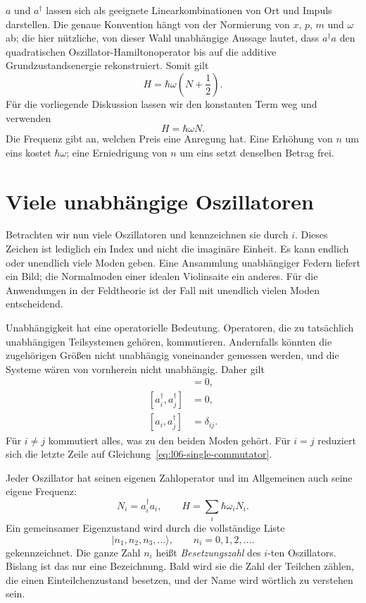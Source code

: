 \(a\) und \(a^\dagger\) lassen sich als geeignete Linearkombinationen von Ort und Impuls darstellen. Die genaue Konvention hängt von der Normierung von \(x\), \(p\), \(m\) und \(\omega\) ab; die hier nützliche, von dieser Wahl unabhängige Aussage lautet, dass \(a^\dagger a\) den quadratischen Oszillator-Hamiltonoperator bis auf die additive Grundzustandsenergie rekonstruiert. Somit gilt
\begin{equation}
H=\hbar\omega\left(N+\frac12\right).
\end{equation}
Für die vorliegende Diskussion lassen wir den konstanten Term weg und verwenden
\begin{equation}
H=\hbar\omega N.
\label{eq:l06-one-oscillator-hamiltonian}
\end{equation}
Die Frequenz gibt an, welchen Preis eine Anregung hat. Eine Erhöhung von \(n\) um eins kostet \(\hbar\omega\); eine Erniedrigung von \(n\) um eins setzt denselben Betrag frei.

\section{Viele unabhängige Oszillatoren}

Betrachten wir nun viele Oszillatoren und kennzeichnen sie durch \(i\). Dieses Zeichen ist lediglich ein Index und nicht die imaginäre Einheit. Es kann endlich oder unendlich viele Moden geben. Eine Ansammlung unabhängiger Federn liefert ein Bild; die Normalmoden einer idealen Violinsaite ein anderes. Für die Anwendungen in der Feldtheorie ist der Fall mit unendlich vielen Moden entscheidend.

Unabhängigkeit hat eine operatorielle Bedeutung. Operatoren, die zu tatsächlich unabhängigen Teilsystemen gehören, kommutieren. Andernfalls könnten die zugehörigen Größen nicht unabhängig voneinander gemessen werden, und die Systeme wären von vornherein nicht unabhängig. Daher gilt
\begin{align}
[a_i,a_j]&=0, \\
[a_i^\dagger,a_j^\dagger]&=0, \\
[a_i,a_j^\dagger]&=\delta_{ij}.
\label{eq:l06-many-commutators}
\end{align}
Für \(i\ne j\) kommutiert alles, was zu den beiden Moden gehört. Für \(i=j\) reduziert sich die letzte Zeile auf Gleichung~\eqref{eq:l06-single-commutator}.

Jeder Oszillator hat seinen eigenen Zahloperator und im Allgemeinen auch seine eigene Frequenz:
\begin{equation}
N_i=a_i^\dagger a_i,
\qquad
H=\sum_i\hbar\omega_i N_i.
\label{eq:l06-many-hamiltonian}
\end{equation}
Ein gemeinsamer Eigenzustand wird durch die vollständige Liste
\begin{equation}
|n_1,n_2,n_3,\ldots\rangle,
\qquad n_i=0,1,2,\ldots.
\label{eq:l06-occupation-ket}
\end{equation}
gekennzeichnet. Die ganze Zahl \(n_i\) heißt \emph{Besetzungszahl} des \(i\)-ten Oszillators. Bislang ist das nur eine Bezeichnung. Bald wird sie die Zahl der Teilchen zählen, die einen Einteilchenzustand besetzen, und der Name wird wörtlich zu verstehen sein.

